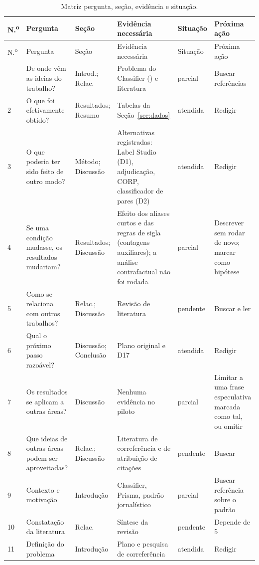 \documentclass[11pt,a4paper]{article}
\begin{document}
\begin{small}
\begin{longtable}{@{}P{0.5cm}P{3.3cm}P{2.0cm}P{4.2cm}P{1.6cm}P{2.6cm}@{}}
\caption{Matriz pergunta, seção, evidência e situação.}\label{tab:matriz}\\
\toprule
N.\textsuperscript{o} & Pergunta & Seção & Evidência necessária & Situação & Próxima ação \\
\midrule
\endfirsthead
\toprule
N.\textsuperscript{o} & Pergunta & Seção & Evidência necessária & Situação & Próxima ação \\
\midrule
\endhead
\bottomrule
{} & De onde vêm as ideias do trabalho? & Introd.; Relac. & Problema do Classifier () e literatura & parcial & Buscar referências \\
2 & O que foi efetivamente obtido? & Resultados; Resumo & Tabelas da Seção~\ref{sec:dados} & atendida & Redigir \\
3 & O que poderia ter sido feito de outro modo? & Método; Discussão & Alternativas registradas: Label Studio (D1), adjudicação, CORP, classificador de pares (D2) & atendida & Redigir \\
4 & Se uma condição mudasse, os resultados mudariam? & Resultados; Discussão & Efeito dos aliases curtos e das regras de sigla (contagens auxiliares); a análise contrafactual não foi rodada & parcial & Descrever sem rodar de novo; marcar como hipótese \\
5 & Como se relaciona com outros trabalhos? & Relac.; Discussão & Revisão de literatura & pendente & Buscar e ler \\
6 & Qual o próximo passo razoável? & Discussão; Conclusão & Plano original e D17 & atendida & Redigir \\
7 & Os resultados se aplicam a outras áreas? & Discussão & Nenhuma evidência no piloto & parcial & Limitar a uma frase especulativa marcada como tal, ou omitir \\
8 & Que ideias de outras áreas podem ser aproveitadas? & Relac.; Discussão & Literatura de correferência e de atribuição de citações & pendente & Buscar \\
9 & Contexto e motivação & Introdução & Classifier, Prisma, padrão jornalístico & parcial & Buscar referência sobre o padrão \\
10 & Constatação da literatura & Relac. & Síntese da revisão & pendente & Depende de 5 \\
11 & Definição do problema & Introdução & Plano e pesquisa de correferência & atendida & Redigir \\

\end{longtable}
\end{small}
\end{document}
